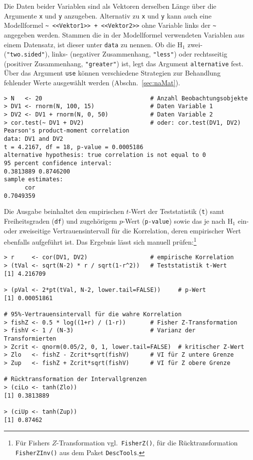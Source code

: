 Die Daten beider Variablen sind als Vektoren derselben Länge über die Argumente \lstinline!x! und \lstinline!y! anzugeben. Alternativ zu \lstinline!x! und \lstinline!y! kann auch eine Modellformel \lstinline!~ <<Vektor1>> + <<Vektor2>>! ohne Variable links der \lstinline!~! angegeben werden. Stammen die in der Modellformel verwendeten Variablen aus einem Datensatz, ist dieser unter \lstinline!data! zu nennen. Ob die $\text{H}_{1}$ zwei- (\lstinline!"two.sided"!), links- (negativer Zusammenhang, \lstinline!"less"!) oder rechtsseitig (positiver Zusammenhang, \lstinline!"greater"!) ist, legt das Argument \lstinline!alternative! fest. Über das Argument \lstinline!use! können verschiedene Strategien zur Behandlung fehlender Werte ausgewählt werden (Abschn.\ \ref{sec:naMat}).
\begin{lstlisting}
> N   <- 20                               # Anzahl Beobachtungsobjekte
> DV1 <- rnorm(N, 100, 15)                # Daten Variable 1
> DV2 <- DV1 + rnorm(N, 0, 50)            # Daten Variable 2
> cor.test(~ DV1 + DV2)                   # oder: cor.test(DV1, DV2)
Pearson's product-moment correlation
data: DV1 and DV2
t = 4.2167, df = 18, p-value = 0.0005186
alternative hypothesis: true correlation is not equal to 0
95 percent confidence interval:
0.3813889 0.8746200
sample estimates:
      cor
0.7049359
\end{lstlisting}

Die Ausgabe beinhaltet den empirischen $t$-Wert der Teststatistik (\lstinline!t!) samt Freiheitsgraden (\lstinline!df!) und zugehörigem $p$-Wert (\lstinline!p-value!) sowie das je nach $\text{H}_{1}$ ein- oder zweiseitige Vertrauensintervall für die Korrelation, deren empirischer Wert ebenfalls aufgeführt ist. Das Ergebnis lässt sich manuell prüfen:\footnote{Für Fishers $Z$-Transformation vgl.\ \lstinline!FisherZ()!, für die Rücktransformation \lstinline!FisherZInv()! aus dem Paket \lstinline!DescTools!.}
\begin{lstlisting}
> r     <- cor(DV1, DV2)                  # empirische Korrelation
> (tVal <- sqrt(N-2) * r / sqrt(1-r^2))   # Teststatistik t-Wert
[1] 4.216709

> (pVal <- 2*pt(tVal, N-2, lower.tail=FALSE))     # p-Wert
[1] 0.00051861

# 95%-Vertrauensintervall für die wahre Korrelation
> fishZ <- 0.5 * log((1+r) / (1-r))       # Fisher Z-Transformation
> fishV <- 1 / (N-3)                      # Varianz der Transformierten
> Zcrit <- qnorm(0.05/2, 0, 1, lower.tail=FALSE)  # kritischer Z-Wert
> Zlo   <- fishZ - Zcrit*sqrt(fishV)      # VI für Z untere Grenze
> Zup   <- fishZ + Zcrit*sqrt(fishV)      # VI für Z obere Grenze

# Rücktransformation der Intervallgrenzen
> (ciLo <- tanh(Zlo))
[1] 0.3813889

> (ciUp <- tanh(Zup))
[1] 0.87462
\end{lstlisting}

